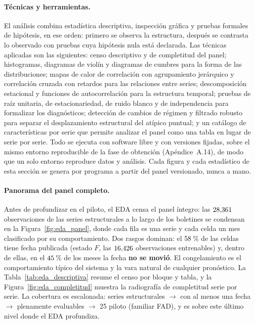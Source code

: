\documentclass[12pt,letterpaper]{report}
\begin{document}
\paragraph{Técnicas y herramientas.} El análisis combina estadística descriptiva,
inspección gráfica y pruebas formales de hipótesis, en ese orden: primero se observa la
estructura, después se contrasta lo observado con pruebas cuya hipótesis nula está declarada.
Las técnicas aplicadas son las siguientes: censo descriptivo y de completitud del panel;
histogramas, diagramas de violín y diagramas de cumbres para la forma de las distribuciones;
mapas de calor de correlación con agrupamiento jerárquico y correlación cruzada con retardos
para las relaciones entre series; descomposición estacional y funciones de autocorrelación
para la estructura temporal; pruebas de raíz unitaria, de estacionariedad, de ruido blanco y
de independencia para formalizar los diagnósticos; detección de cambios de régimen y filtrado
robusto para separar el desplazamiento estructural del atípico puntual; y un catálogo de
características por serie que permite analizar el panel como una tabla en lugar de serie por
serie. Todo se ejecuta con software libre y con versiones fijadas, sobre el mismo entorno
reproducible de la fase de obtención (Apéndice~A.14), de modo que un solo entorno reproduce
datos y análisis. Cada figura y cada estadístico de esta sección se genera por programa a
partir del panel versionado, nunca a mano.

\paragraph{Panorama del panel completo.} Antes de profundizar en el piloto, el EDA
censa el panel íntegro: las $28{,}361$ observaciones de las \factNSeriesStructural{} series estructurales
a lo largo de los \factNMonths{} boletines se condensan en la Figura~\ref{fig:eda_panel}, donde
cada fila es una serie y cada celda un mes clasificado por su comportamiento. Dos
rasgos dominan: el $58$\,\% de las celdas tiene fecha publicada (estado $F$, las
$16{,}426$ observaciones entrenables) y, dentro de ellas, en el $45$\,\% de los meses
la fecha \textbf{no se movió}. El congelamiento es el comportamiento típico del
sistema y la vara natural de cualquier pronóstico. La Tabla~\ref{tab:eda_descriptiva}
resume el censo por bloque y tabla, y la Figura~\ref{fig:eda_completitud} muestra la
radiografía de completitud serie por serie. La cobertura es escalonada: \factNSeriesStructural{} series
estructurales $\rightarrow$ \factNSeriesWithF{} con al menos una fecha $\rightarrow$ \factNSeriesEvaluable{} plenamente
evaluables $\rightarrow$ 25 piloto (familiar FAD), y es sobre este último nivel donde
el EDA profundiza.
\end{document}
